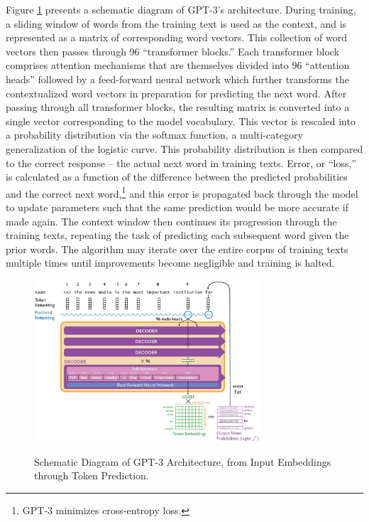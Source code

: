\documentclass{article} %
\begin{document}
Figure \ref{fig:schematic2} presents a schematic diagram of GPT-3's architecture. During
training, a sliding window of words from the training text is used as
the context, and is represented as a matrix of corresponding word
vectors. This collection of word vectors then passes through 96
``transformer blocks.'' Each transformer block comprises attention
mechanisms that are themselves divided into 96 ``attention heads''
followed by a feed-forward neural network which further transforms the
contextualized word vectors in preparation for predicting the next word.
After passing through all transformer blocks, the resulting matrix is
converted into a single vector corresponding to the model vocabulary.
This vector is rescaled into a probability distribution via the softmax
function, a multi-category generalization of the logistic curve. This
probability distribution is then compared to the correct response -- the
actual next word in training texts. Error, or ``loss,'' is calculated as
a function of the difference between the predicted probabilities and the
correct next word,\footnote{GPT-3 minimizes cross-entropy loss.} and
this error is propagated back through the model to update parameters
such that the same prediction would be more accurate if made again. The
context window then continues its progression through the training
texts, repeating the task of predicting each subsequent word given the
prior words. The algorithm may iterate over the entire corpus of
training texts multiple times until improvements become negligible and
training is halted.

\begin{figure}[!htbp]
  \captionsetup{justification=raggedright,singlelinecheck=false}
  \caption{Schematic Diagram of GPT-3 Architecture, from Input Embeddings through Token Prediction.}
  \centering
\includegraphics[width=0.75\textwidth]{./figures/media/image16.jpg}
\label{fig:schematic2}
\end{figure}
\end{document}
